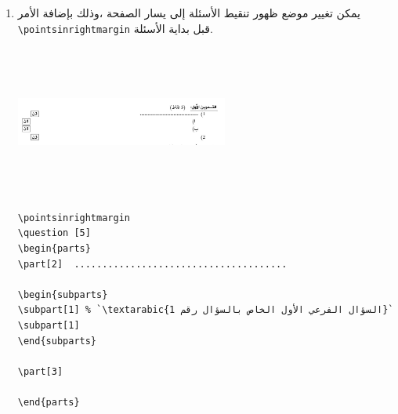 \documentclass[11pt,A4]{article}
\begin{document}
\begin{enumerate}
\begin{tcolorbox}[attach boxed title to top right=
{yshift=-\tcboxedtitleheight/3,xshift=-5mm},title=\textarabic{\sffamily مثال},colbacktitle=BrickRed,sidebyside]
\begin{english}
\begin{lstlisting}
\end{parts}
\end{lstlisting}
\end{english}
\end{tcolorbox}
\item
يمكن تغيير موضع ظهور تنقيط الأسئلة إلى يسار الصفحة ،وذلك بإضافة الأمر
\verb#\pointsinrightmargin#
قبل بداية الأسئلة.
 \begin{tcolorbox}[attach boxed title to top right=
{yshift=-\tcboxedtitleheight/3,xshift=-5mm},title=\textarabic{\sffamily مثال},colbacktitle=BrickRed,sidebyside]
\includegraphics[width=7cm,height=5cm]{9.JPG} 
\tcblower

\begin{english}
\begin{lstlisting}
\pointsinrightmargin
\question [5]
\begin{parts}
\part[2]  ......................................

\begin{subparts}
\subpart[1] % `\textarabic{السؤال الفرعي الأول الخاص بالسؤال رقم 1}` 
\subpart[1]
\end{subparts}

\part[3]

\end{parts}
\end{lstlisting}
\end{english}
\end{tcolorbox}


\end{enumerate}
\end{document}
